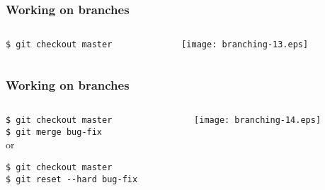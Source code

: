 \documentclass[english]{beamer}
\newcommand{\CMD}[1]{%
\texttt{\textcolor{code-blue}{#1}}%
}
\newcommand{\faint}[1]{%
\textcolor{code-gray}{#1}%
}
\begin{document}
\begin{frame}
\frametitle{Working on branches}

\begin{columns}[t]
        \begin{column}[T]{.5\textwidth}
                {\small
                \CMD{\$ git checkout master} \\
                }
        \end{column}
        \begin{column}[T]{.5\textwidth}
                \texttt{[image: branching-13.eps]}
        \end{column}
\end{columns}
\end{frame}

\begin{frame}
\frametitle{Working on branches}

\begin{columns}[t]
        \begin{column}[T]{.5\textwidth}
                {\small
                \CMD{\$ git checkout master} \\

                \CMD{\$ git merge bug-fix} \\

                \pause{}
                \vspace{\baselineskip}
                \faint{or}
                \vspace{\baselineskip}

                \CMD{\$ git checkout master} \\
                \CMD{\$ git reset {-}-hard bug-fix} \\
                }
        \end{column}
        \begin{column}[T]{.5\textwidth}
                \texttt{[image: branching-14.eps]}
        \end{column}
\end{columns}
\end{frame}
\end{document}

